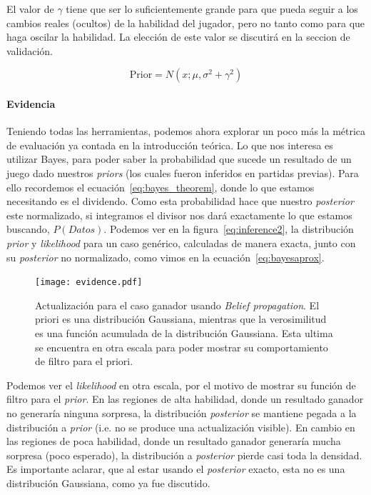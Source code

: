 \documentclass[11pt,twoside, spanish]{report} %
\begin{document}
El valor de  $\gamma$ tiene que ser lo suficientemente grande para que pueda seguir a los cambios reales (ocultos) de la habilidad del jugador, pero no tanto como para que haga oscilar la habilidad.
La elecci\'on de este valor se discutir\'a en la seccion de validaci\'on.

\begin{equation}
	\text{Prior}=N(x;\mu,\sigma^2+\gamma^2)
\end{equation}

\paragraph{Evidencia}
Teniendo todas las herramientas, podemos ahora explorar un poco m\'as la m\'etrica de evaluaci\'on ya contada en la introducci\'on te\'orica.
Lo que nos interesa es utilizar Bayes, para poder saber la probabilidad que sucede un resultado de un juego dado nuestros \textit{priors} (los cuales fueron inferidos en partidas previas).
Para ello recordemos el ecuaci\'on~\ref{eq:bayes_theorem}, donde lo que estamos necesitando es el dividendo.
Como esta probabilidad hace que nuestro \textit{posterior} este normalizado, si integramos el divisor nos dar\'a exactamente lo que estamos buscando, $P(Datos)$.
Podemos ver en la figura~\ref{eq:inference2}, la distribuci\'on \textit{prior} y \textit{likelihood} para un caso gen\'erico, calculadas de manera exacta, junto con su \textit{posterior} no normalizado, como vimos en la ecuaci\'on~\ref{eq:bayesaprox}.


\begin{figure}[H]
	\centering
	\texttt{[image: evidence.pdf]}
	\caption{Actualizaci\'on para el caso ganador usando \textit{Belief propagation}. El priori es una distribuci\'on Gaussiana, mientras que la verosimilitud es una funci\'on acumulada de la distribuci\'on Gaussiana. Esta ultima se encuentra en otra escala para poder mostrar su comportamiento de filtro para el priori.}
	\label{fig:evidencia}
\end{figure}

Podemos ver el \textit{likelihood} en otra escala, por el motivo de mostrar su funci\'on de filtro para el \textit{prior}.
En las regiones de alta habilidad, donde un resultado ganador no generar\'ia ninguna sorpresa, la distribuci\'on \textit{posterior} se mantiene pegada a la distribuci\'on a \textit{prior} (i.e. no se produce una actualizaci\'on visible).
En cambio en las regiones de poca habilidad, donde un resultado ganador generar\'ia mucha sorpresa (poco esperado), la distribuci\'on a \textit{posterior} pierde casi toda la densidad.
Es importante aclarar, que al estar usando el \textit{posterior} exacto, esta no es una distribuci\'on Gaussiana, como ya fue discutido.
\end{document}
